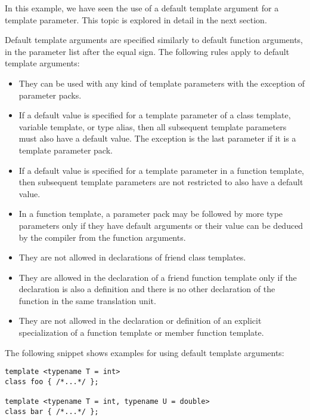In this example, we have seen the use of a default template argument for a template parameter. This topic is explored in detail in the next section.


Default template arguments are specified similarly to default function arguments, in the parameter list after the equal sign. The following rules apply to default template arguments:

\begin{itemize}
\item 
They can be used with any kind of template parameters with the exception of parameter packs.

\item 
If a default value is specified for a template parameter of a class template, variable template, or type alias, then all subsequent template parameters must also have a default value. The exception is the last parameter if it is a template parameter pack.

\item 
If a default value is specified for a template parameter in a function template, then subsequent template parameters are not restricted to also have a default value.

\item 
In a function template, a parameter pack may be followed by more type parameters only if they have default arguments or their value can be deduced by the compiler from the function arguments.

\item 
They are not allowed in declarations of friend class templates.

\item 
They are allowed in the declaration of a friend function template only if the declaration is also a definition and there is no other declaration of the function in the same translation unit.

\item 
They are not allowed in the declaration or definition of an explicit specialization of a function template or member function template.
\end{itemize}

The following snippet shows examples for using default template arguments:

\begin{lstlisting}[style=styleCXX]
template <typename T = int>
class foo { /*...*/ };

template <typename T = int, typename U = double>
class bar { /*...*/ };
\end{lstlisting}

